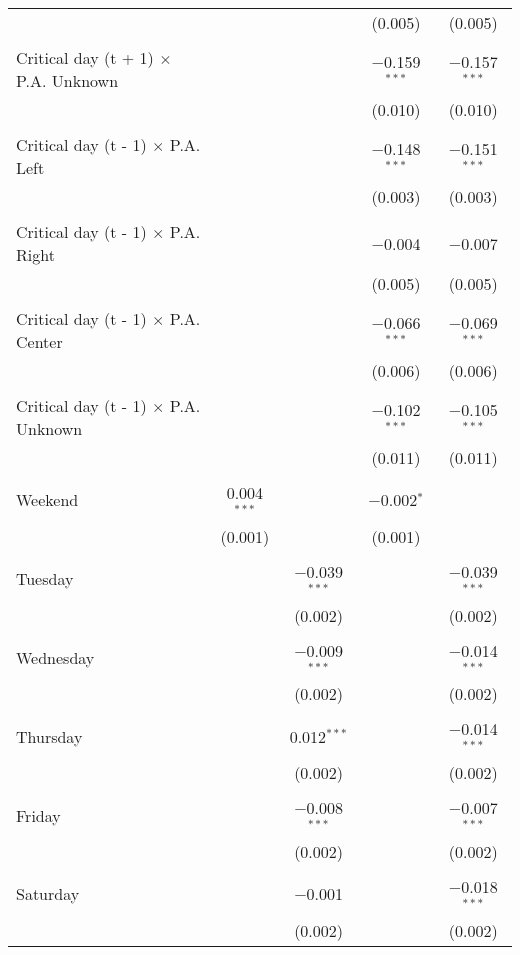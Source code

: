 \documentclass[
]{article}
\begin{document}
\begin{table}[!htbp]
{\begin{tabular}{@{\extracolsep{5pt}}lcccc}
  &  &  & (0.005) & (0.005) \\ 
  & & & & \\ 
 Critical day (t + 1) $\times$ P.A. Unknown &  &  & $-$0.159$^{***}$ & $-$0.157$^{***}$ \\ 
  &  &  & (0.010) & (0.010) \\ 
  & & & & \\ 
 Critical day (t - 1) $\times$ P.A. Left &  &  & $-$0.148$^{***}$ & $-$0.151$^{***}$ \\ 
  &  &  & (0.003) & (0.003) \\ 
  & & & & \\ 
 Critical day (t - 1) $\times$ P.A. Right &  &  & $-$0.004 & $-$0.007 \\ 
  &  &  & (0.005) & (0.005) \\ 
  & & & & \\ 
 Critical day (t - 1) $\times$ P.A. Center &  &  & $-$0.066$^{***}$ & $-$0.069$^{***}$ \\ 
  &  &  & (0.006) & (0.006) \\ 
  & & & & \\ 
 Critical day (t - 1) $\times$ P.A. Unknown &  &  & $-$0.102$^{***}$ & $-$0.105$^{***}$ \\ 
  &  &  & (0.011) & (0.011) \\ 
  & & & & \\ 
 Weekend & 0.004$^{***}$ &  & $-$0.002$^{*}$ &  \\ 
  & (0.001) &  & (0.001) &  \\ 
  & & & & \\ 
 Tuesday &  & $-$0.039$^{***}$ &  & $-$0.039$^{***}$ \\ 
  &  & (0.002) &  & (0.002) \\ 
  & & & & \\ 
 Wednesday &  & $-$0.009$^{***}$ &  & $-$0.014$^{***}$ \\ 
  &  & (0.002) &  & (0.002) \\ 
  & & & & \\ 
 Thursday &  & 0.012$^{***}$ &  & $-$0.014$^{***}$ \\ 
  &  & (0.002) &  & (0.002) \\ 
  & & & & \\ 
 Friday &  & $-$0.008$^{***}$ &  & $-$0.007$^{***}$ \\ 
  &  & (0.002) &  & (0.002) \\ 
  & & & & \\ 
 Saturday &  & $-$0.001 &  & $-$0.018$^{***}$ \\ 
  &  & (0.002) &  & (0.002) \\ 

\end{tabular}}
\end{table}
\end{document}
